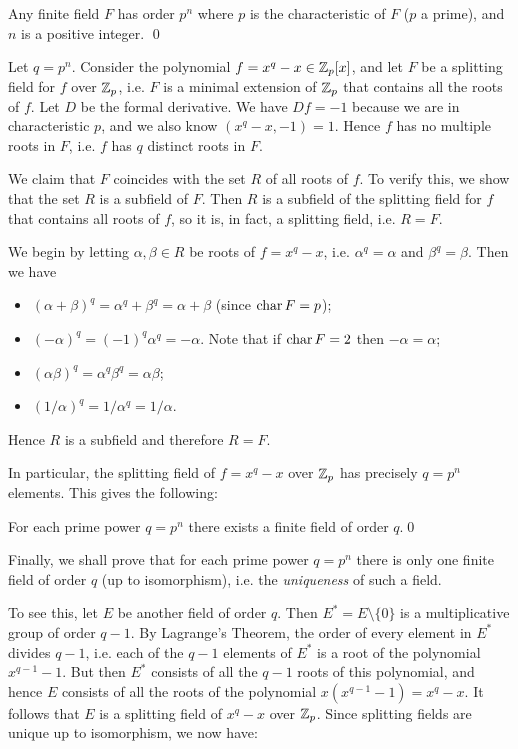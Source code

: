 \begin{fact}
	Any finite field $F$ has order $p^n$ where $p$ is the characteristic of $F$ ($p$ a prime), and $n$ is a positive integer. \qed
\end{fact}

Let $q = p^n$. Consider the polynomial $f = x^q - x \in \mathbb{Z}_p[x]$, and let $F$ be a splitting field for $f$ over $\mathbb{Z}_p$, i.e. $F$ is a minimal extension of $\mathbb{Z}_p$ that contains all the roots of $f$. Let $D$ be the formal derivative. We have $Df = -1$ because we are in characteristic $p$, and we also know $(x^q - x, -1) = 1$. Hence $f$ has no multiple roots in $F$, i.e. $f$ has $q$ distinct roots in $F$.

We claim that $F$ coincides with the set $R$ of all roots of $f$. To verify this, we show that the set $R$ is a subfield of $F$. Then $R$ is a subfield of the splitting field for $f$ that contains all roots of $f$, so it is, in fact, a splitting field, i.e. $R = F$.

We begin by letting $\alpha, \beta \in R$ be roots of $f = x^q - x$, i.e. $\alpha^q = \alpha$ and $\beta^q = \beta$. Then we have
\begin{itemize}
	\item $(\alpha + \beta)^q = \alpha^q + \beta^q = \alpha + \beta$ (since $\operatorname{char}{F} = p$);
	\item $(-\alpha)^q = (-1)^q \alpha^q = -\alpha$. Note that if $\operatorname{char}{F} = 2$ then $-\alpha = \alpha$;
	\item $(\alpha\beta)^q = \alpha^q \beta^q = \alpha\beta$;
	\item $(1 / \alpha)^q = 1 / \alpha^q = 1 / \alpha$.
\end{itemize}
Hence $R$ is a subfield and therefore $R = F$.

In particular, the splitting field of $f = x^q - x$ over $\mathbb{Z}_p$ has precisely $q = p^n$ elements. This gives the following:

\begin{fact}
	For each prime power $q = p^n$ there exists a finite field of order $q$.\qed
\end{fact}

Finally, we shall prove that for each prime power $q = p^n$ there is only one finite field of order $q$ (up to isomorphism), i.e. the \emph{uniqueness} of such a field.

To see this, let $E$ be another field of order $q$. Then $E^* = E \setminus \{0\}$ is a multiplicative group of order $q - 1$. By Lagrange's Theorem, the order of every element in $E^*$ divides $q - 1$, i.e. each of the $q - 1$ elements of $E^*$ is a root of the polynomial $x^{q - 1} - 1$. But then $E^*$ consists of all the $q - 1$ roots of this polynomial, and hence $E$ consists of all the roots of the polynomial $x(x^{q - 1} - 1) = x^q - x$. It follows that $E$ is a splitting field of $x^q - x$ over $\mathbb{Z}_p$. Since splitting fields are unique up to isomorphism, we now have:


